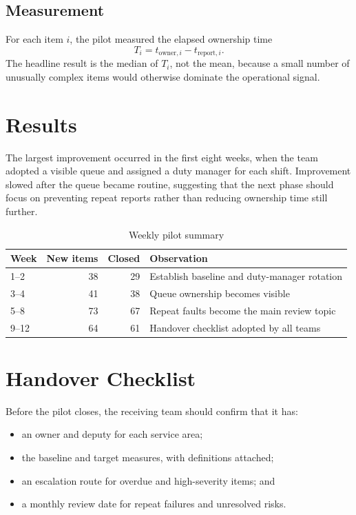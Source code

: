 \documentclass{erdc}
\begin{document}
\section{Measurement}

For each item $i$, the pilot measured the elapsed ownership time
\begin{equation}
  T_i = t_{\mathrm{owner},i} - t_{\mathrm{report},i}.
\end{equation}
The headline result is the median of $T_i$, not the mean, because a small number
of unusually complex items would otherwise dominate the operational signal.

\chapter{Results}

The largest improvement occurred in the first eight weeks, when the team adopted
a visible queue and assigned a duty manager for each shift. Improvement slowed
after the queue became routine, suggesting that the next phase should focus on
preventing repeat reports rather than reducing ownership time still further.

\begin{table}[ht]
  \centering
  \caption{Weekly pilot summary}
  \begin{tabularx}{0.9\textwidth}{@{}l r r X@{}}
    \toprule
    Week & New items & Closed & Observation \\
    \midrule
    1--2 & 38 & 29 & Establish baseline and duty-manager rotation \\
    3--4 & 41 & 38 & Queue ownership becomes visible \\
    5--8 & 73 & 67 & Repeat faults become the main review topic \\
    9--12 & 64 & 61 & Handover checklist adopted by all teams \\
    \bottomrule
  \end{tabularx}
\end{table}

\chapter{Handover Checklist}

Before the pilot closes, the receiving team should confirm that it has:
\begin{itemize}
  \item an owner and deputy for each service area;
  \item the baseline and target measures, with definitions attached;
  \item an escalation route for overdue and high-severity items; and
  \item a monthly review date for repeat failures and unresolved risks.
\end{itemize}
\end{document}
